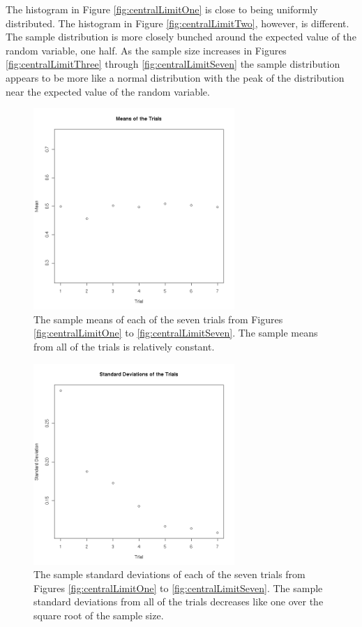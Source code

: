 \documentclass[12pt]{article}
\begin{document}
The histogram in Figure \ref{fig:centralLimitOne} is close to being
uniformly distributed. The histogram in Figure
\ref{fig:centralLimitTwo}, however, is different. The sample
distribution is more closely bunched around the expected value of the
random variable, one half. As the sample size increases in Figures
\ref{fig:centralLimitThree} through \ref{fig:centralLimitSeven} the
sample distribution appears to be more like a normal distribution with
the peak of the distribution near the expected value of the random
variable.


\begin{figure}[htp]
  \centerline{\includegraphics[height=3in]{centralLimitMeans}}
  \caption{The sample means of each of the seven  trials from Figures
    \ref{fig:centralLimitOne} to \ref{fig:centralLimitSeven}. The sample
    means from all of the trials is relatively constant.}
  \label{fig:centralLimitMeans}
\end{figure}

\begin{figure}[htp]
  \centerline{\includegraphics[height=3in]{centralLimitSTD}}
  \caption{The sample standard deviations of each of the seven trials
    from Figures \ref{fig:centralLimitOne} to \ref{fig:centralLimitSeven}.
    The sample standard deviations from all of the trials decreases
    like one over the square root of the sample size.}
  \label{fig:centralLimitSTD}
\end{figure}
\end{document}
